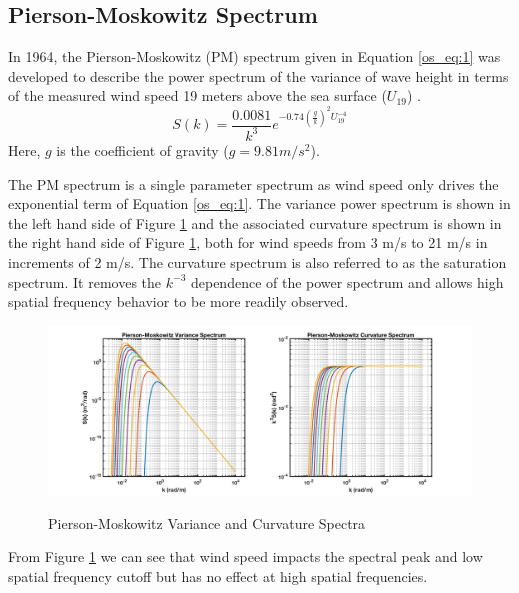 \subsection{Pierson-Moskowitz Spectrum}
In 1964, the Pierson-Moskowitz (PM) spectrum given in Equation \ref{os_eq:1} was developed to describe the power spectrum of the variance of wave height in terms of the measured wind speed 19 meters above the sea surface ($U_{19}$) \cite{michel_sea_spectra}. 
 \begin{equation}
S(k) = \frac{0.0081}{k^3}e^{-0.74\left(\frac{g}{k}\right)^2U_{19}^{-4}}
\label{os_eq:1}
\end{equation}
 \renewcommand{\baselinestretch}{2} \small\normalsize
Here, $g$ is the coefficient of gravity ($g = 9.81 m/s^2$). 
 
The PM spectrum is a single parameter spectrum as wind speed only drives the exponential term of Equation \ref{os_eq:1}. The variance power spectrum is shown in the left hand side of Figure \ref{os_fig:1} and the associated curvature spectrum is shown in the right hand side of Figure \ref{os_fig:1}, both for wind speeds from 3 m/s to 21 m/s in increments of 2 m/s. The curvature spectrum is also referred to as the saturation spectrum. It removes the $k^{-3}$ dependence of the power spectrum and allows high spatial frequency behavior to be more readily observed.
 
 \begin{figure}[H]
  \begin{center}
\includegraphics[width=6in]{../media/Ocean_Surface/PM_variance_curvature_spectrum.png}
  \end{center}
  \renewcommand{\baselinestretch}{1} \small\normalsize
  \begin{quote}
    \caption[Pierson-Moskowitz Variance and Curvature Spectra]{Pierson-Moskowitz Variance and Curvature Spectra\label{os_fig:1}}
  \end{quote}
\end{figure}
 \renewcommand{\baselinestretch}{2} \small\normalsize
From Figure \ref{os_fig:1} we can see that wind speed impacts the spectral peak and low spatial frequency cutoff but has no effect at high spatial frequencies.
 
